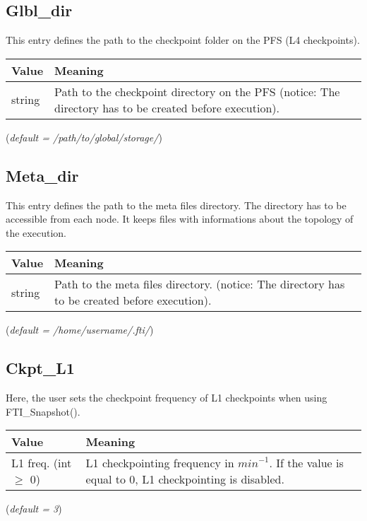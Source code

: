 \documentclass{refrep}
\begin{document}
\subsection{Glbl\_dir}\label{subsec:glbldir}
This entry defines the path to the checkpoint folder on the PFS (L4 checkpoints).
\begin{center}
\begin{tabular}[h!]{|p{}|p{}|}
\hline
\textbf{Value} & \textbf{Meaning} \\ \hline
string & Path to the checkpoint directory on the PFS (notice: The directory has to be created before execution). \\ \hline
\end{tabular}
\end{center}
(\textit{default = /path/to/global/storage/})
\subsection{Meta\_dir}\label{subsec:metadir}
This entry defines the path to the meta files directory. The directory has to be accessible from each node. It keeps files with informations about the topology of the execution.
\begin{center}
\begin{tabular}[h!]{|p{}|p{}|}
\hline
\textbf{Value} & \textbf{Meaning} \\ \hline
string & Path to the meta files directory. (notice: The directory has to be created before execution). \\ \hline
\end{tabular}
\end{center}
(\textit{default = /home/username/.fti/})
\subsection{Ckpt\_L1}\label{subsec:ckptl1}
Here, the user sets the checkpoint frequency of L1 checkpoints when using FTI\_Snapshot().
\begin{center}
\begin{tabular}[h!]{|p{}|p{}|}
\hline
\textbf{Value} & \textbf{Meaning} \\ \hline
L1 freq. (int $\geq$ 0)  & L1 checkpointing frequency in $\textit{min}^{-1}$. If the value is equal to 0, L1 checkpointing is disabled.  \\ \hline
\end{tabular}
\end{center}
(\textit{default = 3})
\end{document}
